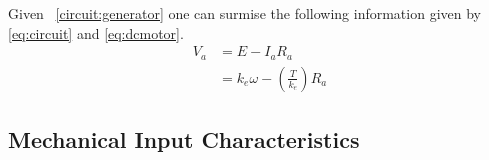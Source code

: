 \documentclass[conference]{IEEEtran}
\newcommand{\figref}[1]{\figurename~\ref{#1}}
\begin{document}
Given \figref{circuit:generator} one can surmise the following information given by \eqref{eq:circuit} and \eqref{eq:dcmotor}.
\begin{equation}
    \label{eq:circuit}
    \begin{aligned}
        V_a &= E - I_aR_a\\
        &= k_e\omega - \left(\frac{T}{k_e}\right)R_a
    \end{aligned}
\end{equation}

\subsection{Mechanical Input Characteristics}





\medskip


\end{document}
